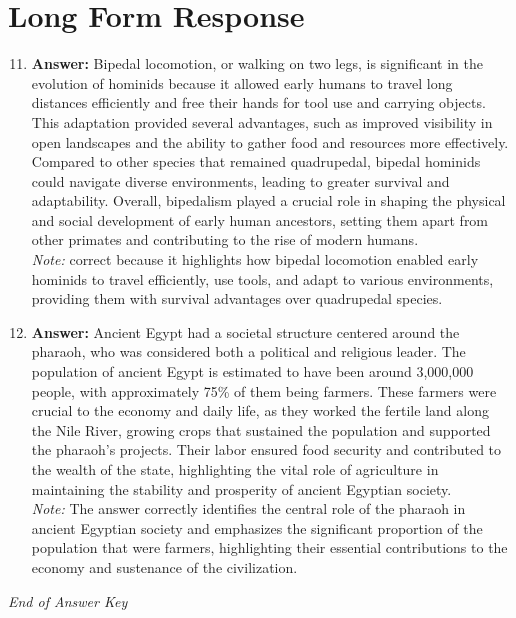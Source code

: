 \documentclass[12pt]{article}
\begin{document}
\section*{Long Form Response}
\begin{enumerate}[label=\arabic*.]
\setcounter{enumi}{10}
\item \textbf{Answer:} Bipedal locomotion, or walking on two legs, is significant in the evolution of hominids because it allowed early humans to travel long distances efficiently and free their hands for tool use and carrying objects. This adaptation provided several advantages, such as improved visibility in open landscapes and the ability to gather food and resources more effectively. Compared to other species that remained quadrupedal, bipedal hominids could navigate diverse environments, leading to greater survival and adaptability. Overall, bipedalism played a crucial role in shaping the physical and social development of early human ancestors, setting them apart from other primates and contributing to the rise of modern humans.
\\ \textit{Note:} correct because it highlights how bipedal locomotion enabled early hominids to travel efficiently, use tools, and adapt to various environments, providing them with survival advantages over quadrupedal species.
\item \textbf{Answer:} Ancient Egypt had a societal structure centered around the pharaoh, who was considered both a political and religious leader. The population of ancient Egypt is estimated to have been around 3,000,000 people, with approximately 75\% of them being farmers. These farmers were crucial to the economy and daily life, as they worked the fertile land along the Nile River, growing crops that sustained the population and supported the pharaoh's projects. Their labor ensured food security and contributed to the wealth of the state, highlighting the vital role of agriculture in maintaining the stability and prosperity of ancient Egyptian society.
\\ \textit{Note:} The answer correctly identifies the central role of the pharaoh in ancient Egyptian society and emphasizes the significant proportion of the population that were farmers, highlighting their essential contributions to the economy and sustenance of the civilization.
\end{enumerate}

\vfill
\noindent\textit{End of Answer Key}
\end{document}
